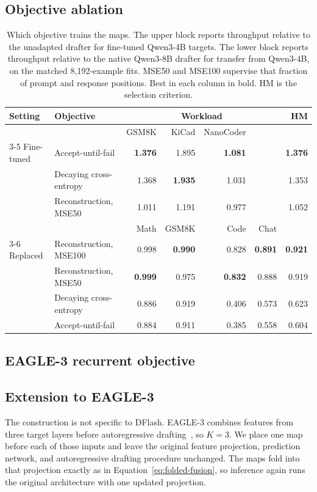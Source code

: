 \subsection{Objective ablation}
\label{app:objective-table}
\begin{table}[t]
\centering
\caption{Which objective trains the maps. The upper block reports throughput relative to the unadapted drafter for fine-tuned Qwen3-4B targets. The lower block reports throughput relative to the native Qwen3-8B drafter for transfer from Qwen3-4B, on the matched 8{,}192-example fits. MSE50 and MSE100 supervise that fraction of prompt and response positions. Best in each column in bold. HM is the selection criterion.}
\label{tab:ablation-objective}
\small
\begin{tabular}{llrrrrr}
\toprule
Setting & Objective & \multicolumn{4}{c}{Workload} & HM \\
\midrule
 & & GSM8K & KiCad & NanoCoder & & \\
\cmidrule(lr){3-5}
Fine-tuned & Accept-until-fail & \textbf{1.376} & 1.895 & \textbf{1.081} & & \textbf{1.376} \\
 & Decaying cross-entropy & 1.368 & \textbf{1.935} & 1.031 & & 1.353 \\
 & Reconstruction, MSE50 & 1.011 & 1.191 & 0.977 & & 1.052 \\
\midrule
 & & Math & GSM8K & Code & Chat & \\
\cmidrule(lr){3-6}
Replaced & Reconstruction, MSE100 & 0.998 & \textbf{0.990} & 0.828 & \textbf{0.891} & \textbf{0.921} \\
 & Reconstruction, MSE50 & \textbf{0.999} & 0.975 & \textbf{0.832} & 0.888 & 0.919 \\
 & Decaying cross-entropy & 0.886 & 0.919 & 0.406 & 0.573 & 0.623 \\
 & Accept-until-fail & 0.884 & 0.911 & 0.385 & 0.558 & 0.604 \\
\bottomrule
\end{tabular}
\end{table}


\subsection{EAGLE-3 recurrent objective}
\label{app:eagle-method}
\subsection{Extension to EAGLE-3}
\label{sec:method-eagle}
The construction is not specific to DFlash. EAGLE-3 combines features from three target layers before autoregressive drafting~\citep{li2025eagle3}, so $K=3$. We place one map before each of those inputs and leave the original feature projection, prediction network, and autoregressive drafting procedure unchanged. The maps fold into that projection exactly as in Equation~\ref{eq:folded-fusion}, so inference again runs the original architecture with one updated projection.

